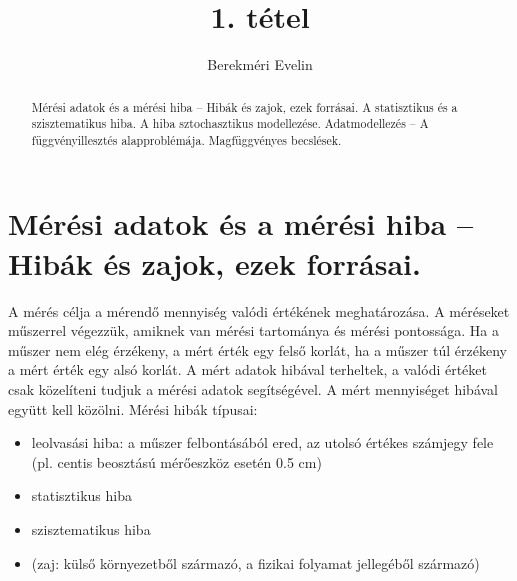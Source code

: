 \documentclass[12pt]{article}
\theoremstyle{plain}
\begin{document}
\title{\textbf{1. tétel}}
\author{Berekméri Evelin}

\maketitle


\begin{abstract}
    Mérési adatok és a mérési hiba – Hibák és zajok, ezek forrásai. A statisztikus és a szisztematikus hiba. A hiba sztochasztikus modellezése. Adatmodellezés – A függvényillesztés alapproblémája. Magfüggvényes becslések.
\end{abstract}

\vfill

\tableofcontents

\newpage

\section{Mérési adatok és a mérési hiba – Hibák és zajok, ezek forrásai.}
A mérés célja a mérendő mennyiség valódi értékének meghatározása. A méréseket műszerrel végezzük, amiknek van mérési tartománya és mérési pontossága. Ha a műszer nem elég érzékeny, a mért érték egy felső korlát, ha a műszer túl érzékeny a mért érték egy alsó korlát. A mért adatok hibával terheltek, a valódi értéket csak közelíteni tudjuk a mérési adatok segítségével.  A mért mennyiséget hibával együtt kell közölni. Mérési hibák típusai:
\begin{itemize}
    \item leolvasási hiba: a műszer felbontásából ered, az utolsó értékes számjegy fele (pl. centis beosztású mérőeszköz esetén 0.5 cm)
    \item statisztikus hiba
    \item szisztematikus hiba
    \item (zaj: külső környezetből származó, a fizikai folyamat jellegéből származó)
\end{itemize}
\end{document}
